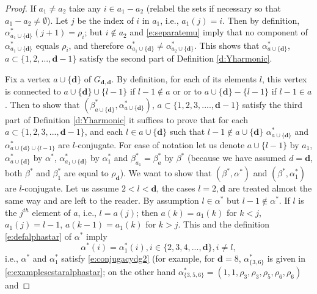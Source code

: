 \documentclass[11pt,a4paper]{article}
\begin{document}
\begin{proof}
If $a_1 \neq a_2$ 
take any $ i \in a_1 -a_2$ (relabel the sets 
if necessary so that  $a_1 -a_2 \neq  \emptyset$).
Let $j$ be the index of $i$ in $a_1$, i.e., $a_1(j) = i$.
Then by definition, $\alpha^*_{a_1\cup\{\boldsymbol d\}}(j+1) = \rho_i$; but
$i \notin a_2$ and \eqref{e:separatemu} imply that no component
of $\alpha^*_{a_1\cup \{\boldsymbol d\}}$ equals $\rho_i$, and therefore
$\alpha^*_{a_1\cup\{\boldsymbol d\}} \neq \alpha^*_{a_2\cup\{\boldsymbol d\}}$. 
This shows that
$\alpha^*_{a \cup \{\boldsymbol d\}}$, $a \subset \{1,2,...,{\bm d}-1\}$ satisfy
the second part of Definition \ref{d:Yharmonic}.


Fix a vertex $a \cup \{\boldsymbol d\}$ of $G_{{\bm d},{\boldsymbol d}}$. 
By definition,
for each of its elements $l$,
this vertex is connected to $ a \cup \{\boldsymbol d\} \cup \{l-1\}$ if
$l-1 \notin a$ or 
or to $ a \cup \{\boldsymbol d\} - \{l-1\}$ if $l-1 \in a$.
Then to show that 
$(\beta^*_{a \cup \{{\bm d} \}}, \alpha^*_{a \cup \{\boldsymbol d\}})$, 
$a \subset \{1,2,3,....,{\bm d}-1\}$
satisfy the third part of Definition \ref{d:Yharmonic} it suffices to 
prove that for each $a \subset \{1,2,3,...,{\bm d}-1\}$,
and each $l \in a \cup \{\boldsymbol d\}$ such that $l-1 \notin a \cup \{\boldsymbol d\}$
$\alpha^*_{a \cup \{\boldsymbol d\}}$ and
$\alpha^*_{a \cup \{\boldsymbol d\} \cup \{l-1\}}$ are $l$-conjugate.
For ease of notation let us denote 
$a \cup \{l-1\}$ by $a_1$,
$\alpha^*_{a\cup \{\boldsymbol d\}}$ by 
$\alpha^*$, $\alpha^*_{a_1 \cup \{\boldsymbol d\}}$ by $\alpha^*_1$ and
 $\beta^*_{a_1} =\beta^*_a$  by $\beta^*$ 
(because we have assumed $d={\boldsymbol d}$,
both 
$\beta^*$ and $\beta^*_1$ are equal to $\rho_{\boldsymbol d}$).
We want to show that $(\beta^*, \alpha^*)$ and $(\beta^*, \alpha^*_1)$ are $l$-conjugate.
Let us assume $2 < l < {\boldsymbol d}$, the cases $l=2,{\boldsymbol d}$ 
are treated almost the same way
and are left to the reader.
By assumption $l \in \alpha^*$ but $l-1 \notin \alpha^*$.
If $l$ is the $j^{th}$ element of $a$, i.e.,
$l = a(j)$; then $a(k) =a_1(k)$ for $k < j$,
$a_1(j)=l-1$, $a(k-1) = a_1(k)$ for $k > j$.
This and the definition \eqref{e:defalphastar} of $\alpha^*$ imply 
\begin{equation}\label{e:therestsame}
\alpha^*(i) = \alpha^*_1(i), i \in \{2,3,4,...,{\bm d} \}, i \neq l,
\end{equation}
i.e., $\alpha^*$ and $\alpha^*_1$ satisfy \eqref{e:conjugacydg2}
(for example, for $\boldsymbol d=8$, $\alpha^*_{\{3,6\}}$ is given in 
\eqref{e:examplescstaralphastar}; on the other hand 
$\alpha^*_{\{3,5,6\}} = (1,1,\rho_3,\rho_3,\rho_5,\rho_6,\rho_6)$ and

\end{proof}
\end{document}
